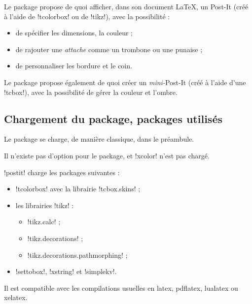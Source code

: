 \documentclass[french,a4paper,11pt]{article}
\begin{document}
\begin{noteblock}
Le package propose de quoi afficher, dans son document \LaTeX, un Post-It (créé à l'aide de \packagetex!tcolorbox! ou de \packagetex!tikz!), avec la possibilité :

\begin{itemize}
	\item de spécifier les dimensions, la couleur ;
	\item de rajouter une \textit{attache} comme un trombone ou une punaise ;
	\item de personnaliser les bordure et le coin.
\end{itemize}

Le package propose également de quoi créer un \textit{mini-}Post-It (créé à l'aide d'une \motcletex!tcbox!), avec la possibilité de gérer la couleur et l'ombre.
\end{noteblock}

\subsection{Chargement du package, packages utilisés}

\begin{importantblock}
Le package se charge, de manière classique, dans le préambule.

Il n'existe pas d'option pour le package, et \packagetex!xcolor! n'est pas chargé.
\end{importantblock}


\begin{noteblock}
\packagetex!postit! charge les packages suivantes :

\begin{itemize}
	\item \packagetex!tcolorbox! avec la librairie \packagetex!tcbox.skins! ;
	\item les librairies \packagetex!tikz! :
	\begin{itemize}
		\item \packagetex!tikz.calc! ;
		\item \packagetex!tikz.decorations! ;
		\item \packagetex!tikz.decorations.pathmorphing! ;
	\end{itemize}
	\item \packagetex!settobox!, \packagetex!xstring! et \packagetex!simplekv!.
\end{itemize}

Il est compatible avec les compilations usuelles en \textsf{latex}, \textsf{pdflatex}, \textsf{lualatex} ou \textsf{xelatex}.
\end{noteblock}
\end{document}
